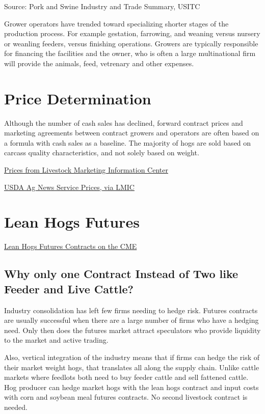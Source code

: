 \documentclass[]{book}
\theoremstyle{definition}
\theoremstyle{definition}
\theoremstyle{remark}
\begin{document}
Source: Pork and Swine Industry and Trade Summary, USITC
\citep{usitctrade}

Grower operators have trended toward specializing shorter stages of the
production process. For example gestation, farrowing, and weaning versus
nursery or weanling feeders, versus finishing operations. Growers are
typically responsible for financing the facilities and the owner, who is
often a large multinational firm will provide the animals, feed,
vetrenary and other expenses.

\section{Price Determination}\label{price-determination}

Although the number of cash sales has declined, forward contract prices
and marketing agreements between contract growers and operators are
often based on a formula with cash sales as a baseline. The majority of
hogs are sold based on carcass quality characteristics, and not solely
based on weight.

\href{http://www.lmic.info/spreadsheet/prices-and-production}{Prices
from Livestock Marketing Information Center}

\href{http://www.lmic.info/quick_market_reports/hogs}{USDA Ag News
Service Prices, via LMIC}

\section{Lean Hogs Futures}\label{lean-hogs-futures}

\href{http://www.cmegroup.com/trading/agricultural/livestock/lean-hogs.html}{Lean
Hogs Futures Contracts on the CME}

\subsection{Why only one Contract Instead of Two like Feeder and Live
Cattle?}\label{why-only-one-contract-instead-of-two-like-feeder-and-live-cattle}

Industry consolidation has left few firms needing to hedge risk. Futures
contracts are usually successful when there are a large number of firms
who have a hedging need. Only then does the futures market attract
speculators who provide liquidity to the market and active trading.

Also, vertical integration of the industry means that if firms can hedge
the risk of their market weight hogs, that translates all along the
supply chain. Unlike cattle markets where feedlots both need to buy
feeder cattle and sell fattened cattle. Hog producer can hedge market
hogs with the lean hogs contract and input costs with corn and soybean
meal futures contracts. No second livestock contract is needed.
\end{document}
